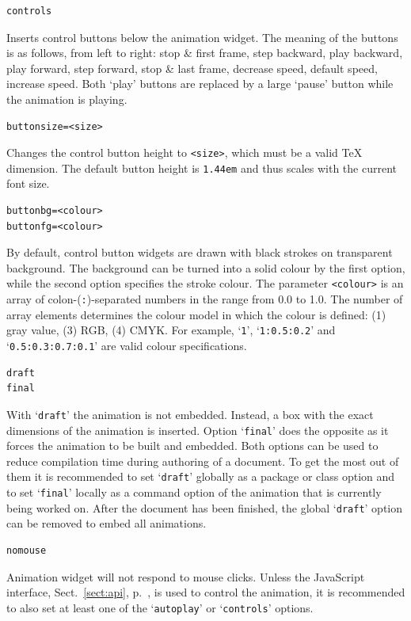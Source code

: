 \documentclass[a4paper]{article}
\begin{document}
\begin{verbatim}
controls
\end{verbatim}
Inserts control buttons below the animation widget. The meaning of the buttons is as follows, from left to right: stop \& first frame, step backward, play backward, play forward, step forward, stop \& last frame, decrease speed, default speed, increase speed. Both `play' buttons are replaced by a large `pause' button while the animation is playing.
\begin{verbatim}
buttonsize=<size>
\end{verbatim}
Changes the control button height to \verb+<size>+, which must be a valid \TeX{} dimension. The default button height is \verb+1.44em+ and thus scales with the current font size.
\begin{verbatim}
buttonbg=<colour>
buttonfg=<colour>
\end{verbatim}
By default, control button widgets are drawn with black strokes on transparent background. The background can be turned into a solid colour by the first option, while the second option specifies the stroke colour. The parameter \verb+<colour>+ is an array of colon-(\verb+:+)-separated numbers in the range from 0.0 to 1.0. The number of array elements determines the colour model in which the colour is defined: (1) gray value, (3) RGB, (4) CMYK. For example, `\verb+1+', `\verb+1:0.5:0.2+' and `\verb+0.5:0.3:0.7:0.1+' are valid colour specifications.
\begin{verbatim}
draft
final
\end{verbatim}
With `\verb+draft+' the animation is not embedded. Instead, a box with the exact dimensions of the animation is inserted. Option `\verb+final+' does the opposite as it forces the animation to be built and embedded. Both options can be used to reduce compilation time during authoring of a document. To get the most out of them it is recommended to set `\verb+draft+' globally as a package or class option and to set `\verb+final+' locally as a command option of the animation that is currently being worked on. After the document has been finished, the global `\verb+draft+' option can be removed to embed all animations.
\begin{verbatim}
nomouse
\end{verbatim}
Animation widget will not respond to mouse clicks. Unless the JavaScript interface, Sect.~\ref{sect:api}, p.~\pageref{sect:api}, is used to control the animation, it is recommended to also set at least one of the `\verb+autoplay+' or `\verb+controls+' options.
\end{document}
